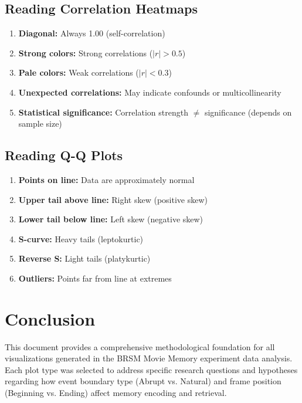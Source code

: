 \documentclass[12pt,a4paper]{article}
\begin{document}
\subsection{Reading Correlation Heatmaps}

\begin{enumerate}
    \item \textbf{Diagonal:} Always 1.00 (self-correlation)
    \item \textbf{Strong colors:} Strong correlations ($|r| > 0.5$)
    \item \textbf{Pale colors:} Weak correlations ($|r| < 0.3$)
    \item \textbf{Unexpected correlations:} May indicate confounds or multicollinearity
    \item \textbf{Statistical significance:} Correlation strength $\neq$ significance (depends on sample size)
\end{enumerate}

\subsection{Reading Q-Q Plots}

\begin{enumerate}
    \item \textbf{Points on line:} Data are approximately normal
    \item \textbf{Upper tail above line:} Right skew (positive skew)
    \item \textbf{Lower tail below line:} Left skew (negative skew)
    \item \textbf{S-curve:} Heavy tails (leptokurtic)
    \item \textbf{Reverse S:} Light tails (platykurtic)
    \item \textbf{Outliers:} Points far from line at extremes
\end{enumerate}

\section{Conclusion}

This document provides a comprehensive methodological foundation for all visualizations generated in the BRSM Movie Memory experiment data analysis. Each plot type was selected to address specific research questions and hypotheses regarding how event boundary type (Abrupt vs. Natural) and frame position (Beginning vs. Ending) affect memory encoding and retrieval.
\end{document}
